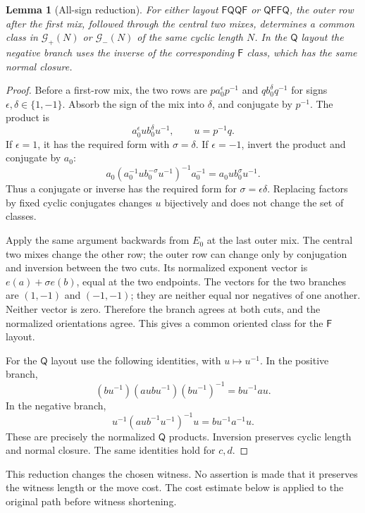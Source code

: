 \documentclass[11pt,a4paper]{article}
\newtheorem{lemma}[theorem]{Lemma}
\theoremstyle{definition}\newtheorem{definition}[theorem]{Definition}
\theoremstyle{remark}\newtheorem{remark}[theorem]{Remark}
\newcommand{\F}{\mathsf F}
\newcommand{\Q}{\mathsf Q}
\begin{document}
\begin{lemma}[All-sign reduction]\label{lem:signs}
For either layout $\F\Q\Q\F$ or $\Q\F\F\Q$, the outer row after the first mix, followed through the central two mixes, determines a common class in $\mathcal G_+(N)$ or $\mathcal G_-(N)$ of the same cyclic length $N$. In the $\Q$ layout the negative branch uses the inverse of the corresponding $\F$ class, which has the same normal closure.
\end{lemma}
\begin{proof}
Before a first-row mix, the two rows are $p a_0^\epsilon p^{-1}$ and $q b_0^\delta q^{-1}$ for signs $\epsilon,\delta\in\{1,-1\}$. Absorb the sign of the mix into $\delta$, and conjugate by $p^{-1}$. The product is
\[
 a_0^\epsilon u b_0^\delta u^{-1},\qquad u=p^{-1}q.
\]
If $\epsilon=1$, it has the required form with $\sigma=\delta$. If $\epsilon=-1$, invert the product and conjugate by $a_0$:
\[
 a_0(a_0^{-1}u b_0^{-\sigma}u^{-1})^{-1}a_0^{-1}
 =a_0u b_0^\sigma u^{-1}.
\]
Thus a conjugate or inverse has the required form for $\sigma=\epsilon\delta$. Replacing factors by fixed cyclic conjugates changes $u$ bijectively and does not change the set of classes.

Apply the same argument backwards from $E_0$ at the last outer mix. The central two mixes change the other row; the outer row can change only by conjugation and inversion between the two cuts. Its normalized exponent vector is $e(a)+\sigma e(b)$, equal at the two endpoints. The vectors for the two branches are $(1,-1)$ and $(-1,-1)$; they are neither equal nor negatives of one another. Neither vector is zero. Therefore the branch agrees at both cuts, and the normalized orientations agree. This gives a common oriented class for the $\F$ layout.

For the $\Q$ layout use the following identities, with $u\mapsto u^{-1}$. In the positive branch,
\[
 (bu^{-1})(aub u^{-1})(bu^{-1})^{-1}=bu^{-1}au.
\]
In the negative branch,
\[
 u^{-1}(aub^{-1}u^{-1})^{-1}u=bu^{-1}a^{-1}u.
\]
These are precisely the normalized $\Q$ products. Inversion preserves cyclic length and normal closure. The same identities hold for $c,d$.
\end{proof}

This reduction changes the chosen witness. No assertion is made that it preserves the witness length or the move cost. The cost estimate below is applied to the original path before witness shortening.
\end{document}
